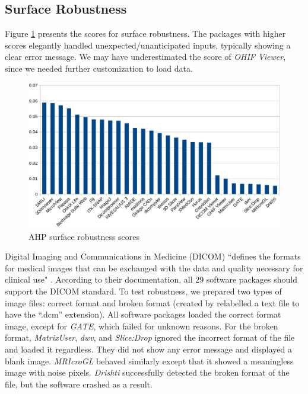 \documentclass[final, 3p, times, authoryear]{elsarticle}
\begin{document}
\subsection{Surface Robustness} \label{sec_result_robustness}

Figure \ref{fg_robustness_scores} presents the scores for surface robustness.
The packages with higher scores elegantly handled unexpected/unanticipated
inputs, typically showing a clear error message. We may have underestimated the
score of \textit{OHIF Viewer}, since we needed further customization to load
data.

\begin{figure}[ht]
\includegraphics[scale=0.38]{figures/robustness_scores.png}
\caption{AHP surface robustness scores}
\label{fg_robustness_scores}
\end{figure}

Digital Imaging and Communications in Medicine (DICOM) ``defines the formats for
medical images that can be exchanged with the data and quality necessary for
clinical use" \citep{MITA2021}. According to their documentation, all 29
software packages should support the DICOM standard. To test robustness, we
prepared two types of image files: correct format and broken format (created by
relabelled a text file to have the ``.dcm'' extension).  All software packages
loaded the correct format image, except for \textit{GATE}, which failed for
unknown reasons.  For the broken format, \textit{MatrixUser}, \textit{dwv}, and
\textit{Slice:Drop} ignored the incorrect format of the file and loaded it
regardless. They did not show any error message and displayed a blank image.
\textit{MRIcroGL} behaved similarly except that it showed a meaningless image
with noise pixels. \textit{Drishti} successfully detected the broken format of
the file, but the software crashed as a result.
\end{document}
